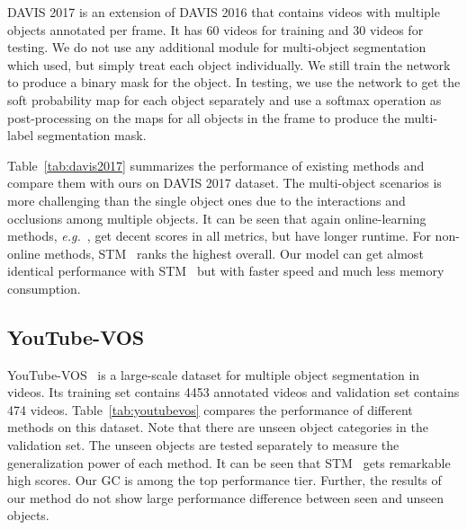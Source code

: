 \documentclass[runningheads]{llncs}
\begin{document}
DAVIS 2017 is an extension of DAVIS 2016 that contains videos with multiple objects annotated per frame. It has 60 videos for training and 30 videos for testing. We do not use any additional module for multi-object segmentation which \cite{stm,ranet} used, but simply treat each object individually. We still train the network to produce a binary mask for the object. In testing, we use the network to get the soft probability map for each object separately and use a softmax operation as post-processing on the maps for all objects in the frame to produce the multi-label segmentation mask.

Table~\ref{tab:davis2017} summarizes the performance of existing methods and compare them with ours on DAVIS 2017 dataset. The multi-object scenarios is more challenging than the single object ones due to the interactions and occlusions among multiple objects. It can be seen that again online-learning methods, \textit{e.g.}~\cite{cinm,premvos}, get decent scores in all metrics, but have longer runtime. For non-online methods, STM~\cite{stm} ranks the highest overall. Our model can get almost identical performance with STM~\cite{stm} but with faster speed and much less memory consumption.

\subsection{YouTube-VOS}

YouTube-VOS~\cite{youtubevos} is a large-scale dataset for multiple object segmentation in videos. Its training set contains 4453 annotated videos and validation set contains 474 videos. Table~\ref{tab:youtubevos} compares the performance of different methods on this dataset. Note that there are unseen object categories in the validation set. The unseen objects are tested separately to measure the generalization power of each method. It can be seen that STM~\cite{stm} gets remarkable high scores. Our GC is among the top performance tier. Further, the results of our method do not show large performance difference between seen and unseen objects.
\end{document}
